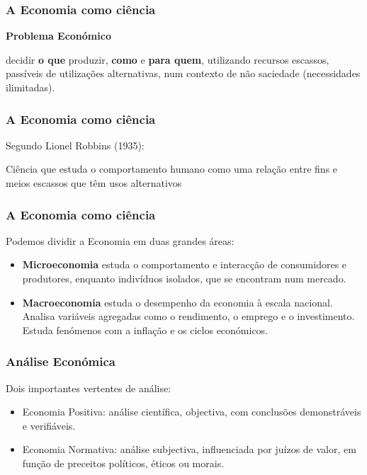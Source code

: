 \begin{frame}
	\frametitle{A Economia como ci\^encia}

	\begin{center}
		\textbf{Problema Econ\'omico}
	\end{center}

	\vspace{0.2cm}

	\pause

	decidir \textbf{o que} produzir, \textbf{como} e \textbf{para quem}, utilizando recursos escassos, pass\'iveis de utiliza\c c\~oes alternativas, num contexto de n\~ao saciedade (necessidades ilimitadas).

\end{frame}

\begin{frame}
	\frametitle{A Economia como ci\^encia}
	Segundo Lionel Robbins (1935):

	\begin{tcolorbox}[colback=red!5,colframe=red!40!black,title=Economia]
		Ci\^encia que estuda o comportamento humano como uma rela\c c\~ao entre fins e meios escassos que t\^em usos alternativos
	\end{tcolorbox}

\end{frame}

\begin{frame}
	\frametitle{A Economia como ci\^encia}

	Podemos dividir a Economia em duas grandes \'areas:\pause

	\begin{itemize}
		\item \textbf{Microeconomia} estuda o comportamento e interac\c c\~ao de consumidores e produtores, enquanto indiv\'iduos isolados, que se encontram num mercado. \pause
		\item \textbf{Macroeconomia} estuda o desempenho da economia \`a escala nacional. Analisa vari\'aveis agregadas como o rendimento, o emprego e o investimento. Estuda fen\'omenos com a infla\c c\~ao e os ciclos econ\'omicos.
	\end{itemize}
\end{frame}

\begin{frame}
	\frametitle{An\'alise Econ\'omica}
	Dois importantes vertentes de an\'alise:\pause
	\begin{itemize}
		\item Economia Positiva: an\'alise cient\'ifica, objectiva, com conclus\~oes demonstr\'aveis e verifi\'aveis.\pause
		\item Economia Normativa: an\'alise subjectiva, influenciada por ju\'izos de valor, em fun\c c\~ao de preceitos pol\'iticos, \'eticos ou morais.
	\end{itemize}
\end{frame}

